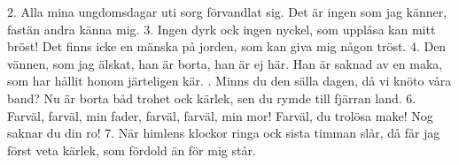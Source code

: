 \setlength{\columnsep}{0.2cm}
\begin{multicols}{2}
2.  Alla mina ungdomsdagar
    uti sorg förvandlat sig.
    Det är ingen som jag känner,
    fastän andra känna mig.
3.  Ingen dyrk ock ingen nyckel,
    som upplåsa kan mitt bröst!
    Det finns icke en mänska på jorden,
    som kan giva mig någon tröst.
4.  Den vännen, som jag älskat,
    han är borta, han är ej här.
    Han är saknad av en maka,
    som har hållit honom järteligen kär.
\vfill{}.  Minns du den sälla dagen,
    då vi knöto våra band?
    Nu är borta båd trohet ock kärlek,
    sen du rymde till fjärran land.
6.  Farväl, farväl, min fader,
    farväl, farväl, min mor!
    Farväl, du trolösa make!
    Nog saknar du din ro!
7.  När himlens klockor ringa
    ock sista timman slår,
    då får jag först veta kärlek,
    som fördold än för mig står.
\end{multicols}
